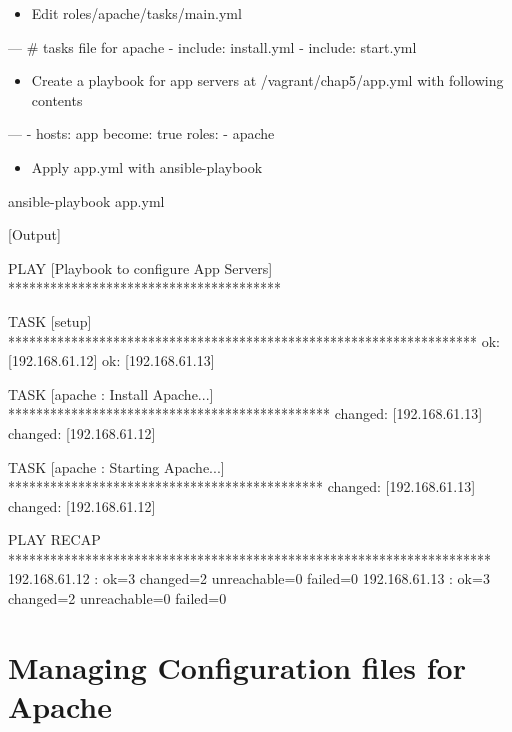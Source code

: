 \begin{itemize}
\item Edit roles/apache/tasks/main.yml
\end{itemize}

\begin{code}
---
# tasks file for apache
- include: install.yml
- include: start.yml
\end{code}

\begin{itemize}
\item Create a playbook for app servers at /vagrant/chap5/app.yml with following contents
\end{itemize}

\begin{code}
---
- hosts: app
  become: true
  roles:
    - apache
\end{code}

\begin{itemize}
\item Apply app.yml with ansible-playbook
\end{itemize}

\begin{code}
ansible-playbook app.yml
\end{code}

[Output]\newline
\begin{code}
PLAY [Playbook to configure App Servers] ***************************************

TASK [setup] *******************************************************************
ok: [192.168.61.12]
ok: [192.168.61.13]

TASK [apache : Install Apache...] **********************************************
changed: [192.168.61.13]
changed: [192.168.61.12]

TASK [apache : Starting Apache...] *********************************************
changed: [192.168.61.13]
changed: [192.168.61.12]

PLAY RECAP *********************************************************************
192.168.61.12              : ok=3    changed=2    unreachable=0    failed=0
192.168.61.13              : ok=3    changed=2    unreachable=0    failed=0
\end{code}

\section{Managing Configuration files for Apache}


